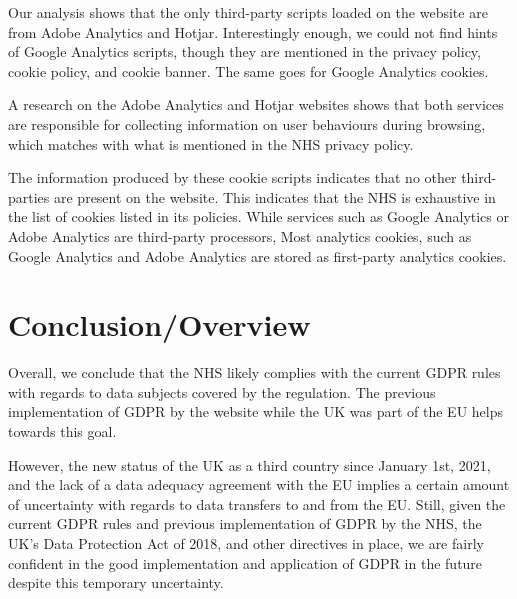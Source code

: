 \documentclass[twocolumn, letterpaper,13pt]{scrartcl}
\begin{document}
    Our analysis shows that the only third-party scripts loaded on the website are from Adobe Analytics and Hotjar. Interestingly enough, we could not find hints of Google Analytics scripts, though they are mentioned in the privacy policy, cookie policy, and cookie banner. The same goes for Google Analytics cookies.
    
    A research on the Adobe Analytics and Hotjar websites shows that both services are responsible for collecting information on user behaviours during browsing, which matches with what is mentioned in the NHS privacy policy.
    
    The information produced by these cookie scripts indicates that no other third-parties are present on the website. This indicates that the NHS is exhaustive in the list of cookies listed in its policies. While services such as Google Analytics or Adobe Analytics are third-party processors, Most analytics cookies, such as Google Analytics and Adobe Analytics are stored as first-party analytics cookies\cite{google}.
    
	\section*{Conclusion/Overview}
	
	   Overall, we conclude that the NHS likely complies with the current GDPR rules with regards to data subjects covered by the regulation. The previous implementation of GDPR by the website while the UK was part of the EU helps towards this goal.
	   
	   However, the new status of the UK as a third country since January 1st, 2021, and the lack of a data adequacy agreement with the EU implies a certain amount of uncertainty with regards to data transfers to and from the EU. Still, given the current GDPR rules and previous implementation of GDPR by the NHS, the UK's Data Protection Act of 2018, and other directives in place, we are fairly confident in the good implementation and application of GDPR in the future despite this temporary uncertainty.
	
\end{document}
